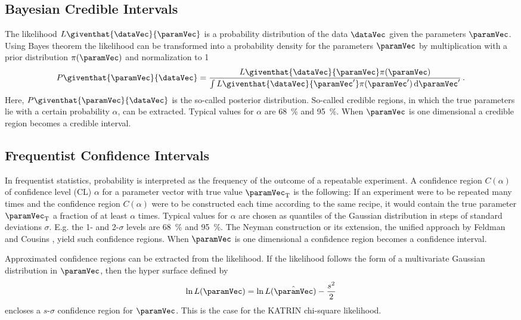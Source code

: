 \subsection{Bayesian Credible Intervals}
The likelihood $L\giventhat{\dataVec}{\paramVec}$ is a probability distribution of the data $\dataVec$ given the parameters $\paramVec$. Using Bayes theorem the likelihood can be transformed into a probability density for the parameters $\paramVec$ by multiplication with a prior distribution $\pi(\paramVec)$ and normalization to 1
\begin{equation}
\label{eq:posterior}
	P\giventhat{\paramVec}{\dataVec} = 
		\frac{
			L\giventhat{\dataVec}{\paramVec}\pi(\paramVec)
		}{
			\int L\giventhat{\dataVec}{\paramVec^\prime}\pi(\paramVec^\prime) \d\paramVec^\prime
		}
	\fullstop
\end{equation}
Here, $P\giventhat{\paramVec}{\dataVec}$ is the so-called posterior distribution. So-called credible regions, in which the true parameters lie with a certain probability $\alpha$, can be extracted.  Typical values for $\alpha$ are \SI{68}{\percent} and \SI{95}{\percent}. When $\paramVec$ is one dimensional a credible region becomes a credible interval. 

\subsection{Frequentist Confidence Intervals}
In frequentist statistics, probability is interpreted as the frequency
of the outcome of a repeatable experiment. A confidence region $C(\alpha)$ of confidence level (CL) $\alpha$ for a parameter vector with true value $\paramVec_\mathrm{T}$ is the following: If an experiment were to be repeated many times and the confidence region $C(\alpha)$ were to be constructed each time according to the same recipe, it would contain the true parameter $\paramVec_\mathrm{T}$ a fraction of at least $\alpha$ times. Typical values for $\alpha$ are chosen as quantiles of the Gaussian distribution in steps of standard deviations $\sigma$. E.g. the 1- and 2-$\sigma$ levels are \SI{68}{\percent} and \SI{95}{\percent}. The Neyman construction \cite{Neyman1937} or its extension, the unified approach by Feldman and Cousins \cite{Feldman1998}, yield such confidence regions. When $\paramVec$ is one dimensional a confidence region becomes a confidence interval. 

Approximated confidence regions can be extracted from the likelihood. If the likelihood follows the form of a multivariate Gaussian distribution in $\paramVec$, then the hyper surface defined by
\begin{equation}
	\ln L(\paramVec) = 	\ln L(\hat{\paramVec}) - \frac{s^2}{2}
\end{equation}
encloses a $s$-$\sigma$ confidence region for $\paramVec$. This is the case for the KATRIN chi-square likelihood.

